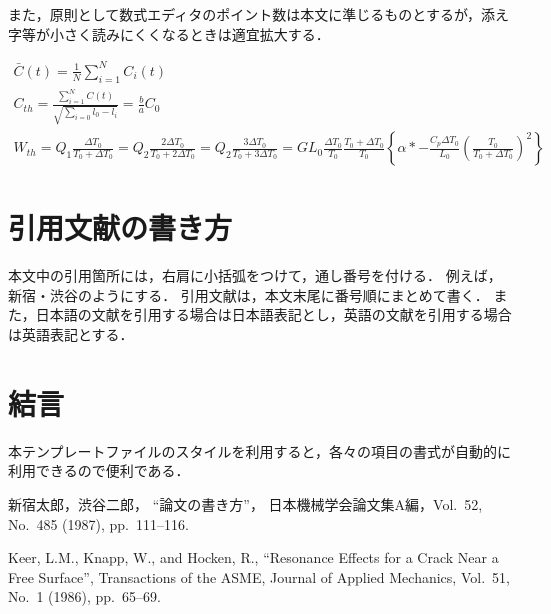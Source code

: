 \documentclass[a4paper, 10pt, dvips, fleqn, uplatex]{jsarticle}
\begin{document}
また，原則として数式エディタのポイント数は本文に準じるものとするが，添え字等が小さく読みにくくなるときは適宜拡大する．

\begin{gather}
  \bar{C}(t) = \frac{1}{N}\sum^{N}_{i=1}{C_{i}(t)} \\
  C_{th} = \frac{\displaystyle \sum^{N}_{i=1}{C(t)}}{\sqrt{\displaystyle \sum^{}_{i=0}{l_{0}-l_{i}}}}
  = \frac{b}{a}C_{0} \\
  W_{th} = Q_{1}\frac{\Delta T_{0}}{T_{0} + \Delta T_{0}}
  = Q_{2}\frac{2\Delta T_{0}}{T_{0} + 2\Delta T_{0}}
  = Q_{2}\frac{3\Delta T_{0}}{T_{0} + 3\Delta T_{0}}
  = GL_{0}\frac{\Delta T_{0}}{T_{0}}\frac{T_{0} + \Delta T_{0}}{T_{0}}
  \left\{ \alpha \ast -\frac{C_{p}\Delta T_{0}}{L_{0}}
  \left( \frac{T_{0}}{T_{0} + \Delta T_{0}} \right)^{2} \right\}
\end{gather}


\section{引用文献の書き方}

本文中の引用箇所には，右肩に小括弧をつけて，通し番号を付ける．
例えば，新宿・渋谷\cite{shinjuku,keer}のようにする．
引用文献は，本文末尾に番号順にまとめて書く．
また，日本語の文献を引用する場合は日本語表記とし，英語の文献を引用する場合は英語表記とする．


\section{結言}

本テンプレートファイルのスタイルを利用すると，各々の項目の書式が自動的に利用できるので便利である．


\begin{thebibliography}{10}
新宿太郎，渋谷二郎，
``論文の書き方''，
日本機械学会論文集A編，Vol.~52, No.~485 (1987), pp.~111--116.

Keer, L.M., Knapp, W., and Hocken, R., ``Resonance Effects for a
Crack Near a Free Surface'', Transactions of the ASME, Journal
of Applied Mechanics, Vol.~51, No.~1 (1986), pp.~65--69.

\end{thebibliography}
\end{document}

